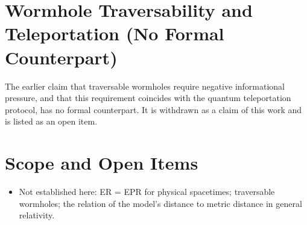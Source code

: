 \documentclass[11pt, a4paper]{article}
\begin{document}
\section{Wormhole Traversability and Teleportation (No Formal Counterpart)}
The earlier claim that traversable wormholes require negative informational pressure, and that this requirement coincides with the quantum teleportation protocol, has no formal counterpart. It is withdrawn as a claim of this work and is listed as an open item.

\section{Scope and Open Items}
\begin{itemize}
  \item Not established here: ER = EPR for physical spacetimes; traversable wormholes; the relation of the model's distance to metric distance in general relativity.
\end{itemize}
\end{document}
